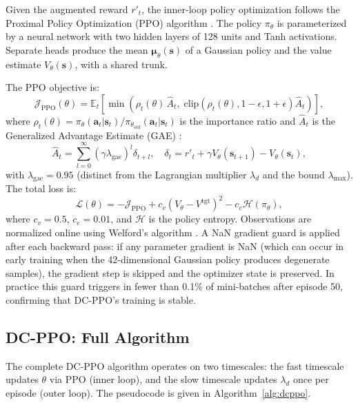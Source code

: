 \documentclass[journal]{IEEEtran}
\newcommand{\ld}{\lambda_d}
\begin{document}
Given the augmented reward $r'_t$, the inner-loop policy
optimization follows the Proximal Policy Optimization (PPO)
algorithm \cite{schulman2017ppo}.
The policy $\pi_\theta$ is parameterized by a neural network with
two hidden layers of 128 units and Tanh activations.
Separate heads produce the mean $\bm{\mu}_\theta(\bm{s})$ of a
Gaussian policy and the value estimate $V_\theta(\bm{s})$,
with a shared trunk.

The PPO objective is:
\begin{equation}
  \mathcal{J}_{\text{PPO}}(\theta) =
  \mathbb{E}_t\!\left[\min\!\left(
    \rho_t(\theta)\, \hat{A}_t,\;
    \text{clip}(\rho_t(\theta), 1{-}\epsilon, 1{+}\epsilon)\hat{A}_t
  \right)\right],
  \label{eq:ppo}
\end{equation}
where $\rho_t(\theta) = \pi_\theta(\bm{a}_t|\bm{s}_t) /
\pi_{\theta_{\text{old}}}(\bm{a}_t|\bm{s}_t)$ is the importance
ratio and $\hat{A}_t$ is the Generalized Advantage Estimate
(GAE) \cite{sutton2018rl_book}:
\begin{equation}
  \hat{A}_t = \sum_{l=0}^{\infty} (\gamma\lambda_{\text{gae}})^l
    \delta_{t+l}, \quad
  \delta_t = r'_t + \gamma V_\theta(\bm{s}_{t+1}) - V_\theta(\bm{s}_t),
  \label{eq:gae}
\end{equation}
with $\lambda_{\text{gae}} = 0.95$
(distinct from the Lagrangian multiplier $\ld$ and the bound $\lambda_{\max}$).
The total loss is:
\begin{equation}
  \mathcal{L}(\theta) = -\mathcal{J}_{\text{PPO}} +
  c_v (V_\theta - V^{\text{tgt}})^2 - c_e \mathcal{H}(\pi_\theta),
  \label{eq:total_loss}
\end{equation}
where $c_v = 0.5$, $c_e = 0.01$, and $\mathcal{H}$ is the
policy entropy.
Observations are normalized online using Welford's algorithm
\cite{welford1962note}.
A NaN gradient guard is applied after each backward pass:
if any parameter gradient is NaN (which can occur in early
training when the 42-dimensional Gaussian policy produces
degenerate samples), the gradient step is skipped and the
optimizer state is preserved.
In practice this guard triggers in fewer than 0.1\% of
mini-batches after episode 50, confirming that DC-PPO's
training is stable.

\subsection{DC-PPO: Full Algorithm}

The complete DC-PPO algorithm operates on two timescales:
the fast timescale updates $\theta$ via PPO (inner loop),
and the slow timescale updates $\ld$ once per episode (outer loop).
The pseudocode is given in Algorithm~\ref{alg:dcppo}.
\end{document}
